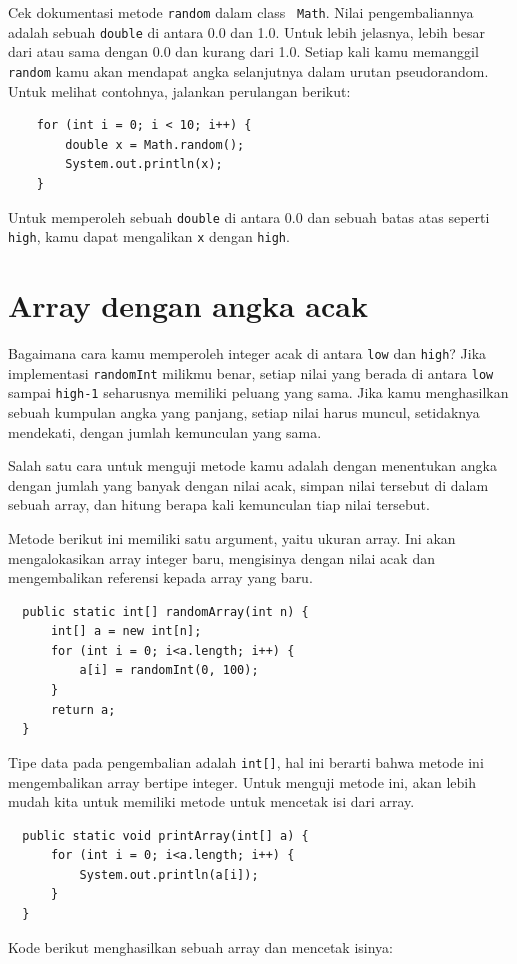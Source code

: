 Cek dokumentasi metode {\tt random} dalam class {\tt
Math}.  Nilai pengembaliannya adalah sebuah {\tt double} di antara 0.0 dan 1.0.
Untuk lebih jelasnya, lebih besar dari atau sama dengan 0.0 dan kurang dari 1.0.  Setiap kali kamu memanggil {\tt random} kamu akan mendapat angka selanjutnya dalam urutan pseudorandom.
Untuk melihat contohnya, jalankan perulangan berikut:

\begin{lstlisting}
    for (int i = 0; i < 10; i++) {
        double x = Math.random();
        System.out.println(x);
    }
\end{lstlisting}
%
Untuk memperoleh sebuah {\tt double} di antara 0.0 dan sebuah batas atas seperti
{\tt high}, kamu dapat mengalikan {\tt x} dengan {\tt high}.


\section{Array dengan angka acak}

Bagaimana cara kamu memperoleh integer acak di antara {\tt low} dan {\tt high}?
Jika implementasi {\tt randomInt} milikmu benar, setiap nilai yang berada di antara {\tt low} sampai {\tt high-1} seharusnya
memiliki peluang yang sama.  Jika kamu menghasilkan sebuah kumpulan angka yang panjang, setiap nilai harus muncul, setidaknya mendekati, dengan jumlah kemunculan yang sama.

Salah satu cara untuk menguji metode kamu adalah dengan menentukan angka dengan jumlah yang banyak dengan nilai acak, simpan nilai tersebut di dalam sebuah array, dan hitung berapa kali kemunculan tiap nilai tersebut.

Metode berikut ini memiliki satu argument, yaitu ukuran array. Ini akan mengalokasikan array integer baru, mengisinya dengan nilai acak dan mengembalikan referensi kepada array yang baru.

\begin{lstlisting}
  public static int[] randomArray(int n) {
      int[] a = new int[n];
      for (int i = 0; i<a.length; i++) {
          a[i] = randomInt(0, 100);
      }
      return a;
  }
\end{lstlisting}
%
Tipe data pada pengembalian adalah {\tt int[]}, hal ini berarti bahwa metode ini mengembalikan array bertipe integer.
Untuk menguji metode ini, akan lebih mudah kita untuk memiliki metode untuk mencetak isi dari array.

\begin{lstlisting}
  public static void printArray(int[] a) {
      for (int i = 0; i<a.length; i++) {
          System.out.println(a[i]);
      }
  }
\end{lstlisting}
%
Kode berikut menghasilkan sebuah array dan mencetak isinya:

